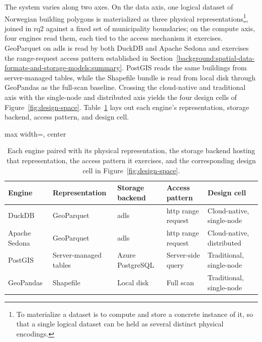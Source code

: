 The system varies along two axes. On the data axis, one logical dataset of Norwegian building polygons is materialized as three physical representations\footnote{To materialize a dataset is to compute and store a concrete instance of it, so that a single logical dataset can be held as several distinct physical encodings.}, joined in \acrshort{rq}2 against a fixed set of municipality boundaries; on the compute axis, four engines read them, each tied to the access mechanism it exercises. GeoParquet on \acrfull{adls} is read by both DuckDB and Apache Sedona and exercises the range-request access pattern established in Section~\ref{background:spatial-data-formats-and-storage-models:summary}. PostGIS reads the same buildings from server-managed tables, while the Shapefile bundle is read from local disk through GeoPandas as the full-scan baseline. Crossing the cloud-native and traditional axis with the single-node and distributed axis yields the four design cells of Figure~\ref{fig:design-space}. Table~\ref{tab:data-engine-mapping} lays out each engine's representation, storage backend, access pattern, and design cell.

\begin{table}[H]
    \centering
    \begin{adjustbox}{max width=\textwidth, center}
    \begin{tabular}{@{}lllll@{}}
        \toprule
        Engine        & Representation        & Storage backend      & Access pattern                & Design cell                \\
        \midrule
        DuckDB        & GeoParquet            & \acrshort{adls}      & \acrshort{http} range request & Cloud-native, single-node  \\
        Apache Sedona & GeoParquet            & \acrshort{adls}      & \acrshort{http} range request & Cloud-native, distributed  \\
        PostGIS       & Server-managed tables & Azure PostgreSQL     & Server-side query             & Traditional, single-node   \\
        GeoPandas     & Shapefile             & Local disk           & Full scan                     & Traditional, single-node   \\
        \bottomrule
    \end{tabular}
    \end{adjustbox}
    \caption[Data representation to engine mapping]{Each engine paired with its physical representation, the storage backend hosting that representation, the access pattern it exercises, and the corresponding design cell in Figure~\ref{fig:design-space}.}
    \label{tab:data-engine-mapping}
\end{table}

